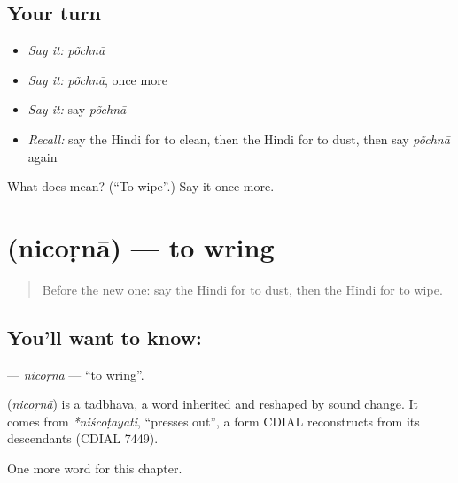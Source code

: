 \subsection*{Your turn}
\begin{itemize}
\raggedright
  \item \emph{Say it:} \emph{põchnā}
  \item \emph{Say it:} \emph{põchnā}, once more
  \item \emph{Say it:} say \emph{põchnā}
  \item \emph{Recall:} say the Hindi for to clean, then the Hindi for to dust, then say \emph{põchnā} again
\end{itemize}

\begin{tcolorbox}[breakable,colback=teal!4,colframe=teal!35!black,title={Before you move on}]
What does  mean? (\textquotedblleft{}To wipe\textquotedblright{}.) Say it once more.
\end{tcolorbox}
\section[\texorpdfstring{\hi{निचोड़ना} (nicoṛnā)}{निचोड़ना (nicoṛnā)}]{ (nicoṛnā) — to wring}

\label{lesson:HI-C225-nicorna}



\begin{quote}
Before the new one: say the Hindi for to dust, then the Hindi for to wipe.
\end{quote}

\subsection*{You'll want to know: }
\textbf{} — \emph{nicoṛnā} — \textquotedblleft{}to wring\textquotedblright{}.

\begin{cousinweb}
\textbf{} (\emph{nicoṛnā}) is a tadbhava, a word inherited and reshaped by sound change. It comes from \emph{*niścoṭayati}, \textquotedblleft{}presses out\textquotedblright{}, a form CDIAL reconstructs from its descendants (CDIAL 7449).
\end{cousinweb}

\begin{grammarlens}[title={What you've built}]
One more word for this chapter.
\end{grammarlens}

